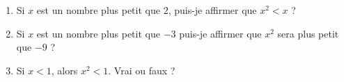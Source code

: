 
\begin{exercice}\label{exosmath-0140}

    \begin{enumerate}
        \item
            Si \( x\) est un nombre plus petit que \( 2\), puis-je affirmer que \( x^2<x\) ?
        \item
            Si \( x\) est un nombre plus petit que \( -3\) puis-je affirmer que \( x^2\) sera plus petit que \( -9\) ?
        \item
            Si \( x<1\), alors \( x^2<1\). Vrai ou faux ?
    \end{enumerate}

\end{exercice}

